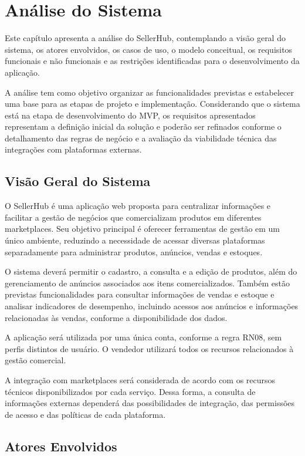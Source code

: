 \chapter{Análise do Sistema}
\label{cap:analise}

Este capítulo apresenta a análise do SellerHub, contemplando a visão geral do sistema, os atores envolvidos, os casos de uso, o modelo conceitual, os requisitos funcionais e não funcionais e as restrições identificadas para o desenvolvimento da aplicação.

A análise tem como objetivo organizar as funcionalidades previstas e estabelecer uma base para as etapas de projeto e implementação. Considerando que o sistema está na etapa de desenvolvimento do MVP, os requisitos apresentados representam a definição inicial da solução e poderão ser refinados conforme o detalhamento das regras de negócio e a avaliação da viabilidade técnica das integrações com plataformas externas.

\section{Visão Geral do Sistema}

O SellerHub é uma aplicação web proposta para centralizar informações e facilitar a gestão de negócios que comercializam produtos em diferentes marketplaces. Seu objetivo principal é oferecer ferramentas de gestão em um único ambiente, reduzindo a necessidade de acessar diversas plataformas separadamente para administrar produtos, anúncios, vendas e estoques.

O sistema deverá permitir o cadastro, a consulta e a edição de produtos, além do gerenciamento de anúncios associados aos itens comercializados. Também estão previstas funcionalidades para consultar informações de vendas e estoque e analisar indicadores de desempenho, incluindo acessos aos anúncios e informações relacionadas às vendas, conforme a disponibilidade dos dados.

A aplicação será utilizada por uma única conta, conforme a regra RN08, sem perfis distintos de usuário. O vendedor utilizará todos os recursos relacionados à gestão comercial.

A integração com marketplaces será considerada de acordo com os recursos técnicos disponibilizados por cada serviço. Dessa forma, a consulta de informações externas dependerá das possibilidades de integração, das permissões de acesso e das políticas de cada plataforma.

\section{Atores Envolvidos}

